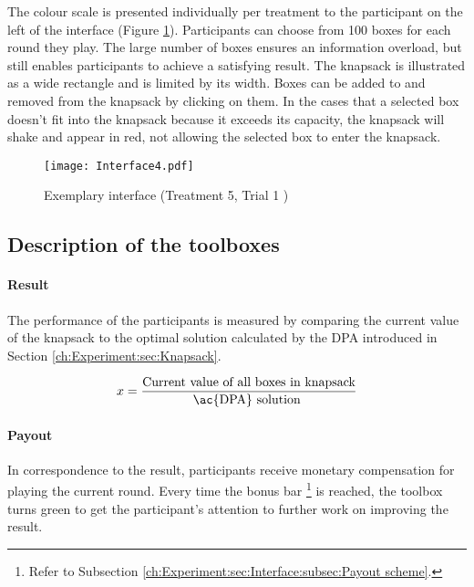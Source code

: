 The colour scale is presented individually per treatment to the participant on the left of the interface (Figure \ref{fig:Interface}).
Participants can choose from 100 boxes for each round they play. The large number of boxes ensures an information overload, but still enables participants to achieve a satisfying result.
The knapsack is illustrated as a wide rectangle and is limited by its width. Boxes can be added to and removed from the knapsack by clicking on them. In the cases that a selected box doesn't fit into the knapsack because it exceeds its capacity, the knapsack will shake and appear in red, not allowing the selected box to enter the knapsack. 
 \begin{figure}[htp] %
\begin{center} %
  \texttt{[image: Interface4.pdf]}
\caption{Exemplary interface (Treatment 5, Trial 1 )}
\end{center}
\label{fig:Interface}
\end{figure} 
\subsection{Description of the toolboxes}

\paragraph{Result}

The performance of the participants is measured by comparing the current value of the knapsack to the optimal solution calculated by the \ac{DPA} introduced in Section \ref{ch:Experiment:sec:Knapsack}.
  
\begin{equation}
x = \dfrac{\text{Current value of all boxes in knapsack}}{\text{\ac{DPA} solution }}
\label{eq:x}
\end{equation}

\paragraph{Payout}

In correspondence to the result, participants receive monetary compensation for playing the current round. Every time the bonus bar \footnote{Refer to Subsection \ref{ch:Experiment:sec:Interface:subsec:Payout scheme}.} is reached, the toolbox turns green to get the participant's attention to further work on improving the result.

